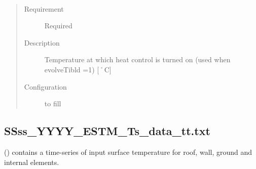 \documentclass[letterpaper,10pt,english]{sphinxmanual}
\begin{document}
\begin{fulllineitems}
\label{\detokenize{input_files/ESTM_related_files/ESTMinput:cmdoption-arg-theat-on}}~\begin{quote}\begin{description}
\item[{Requirement}] \leavevmode
Required

\item[{Description}] \leavevmode
Temperature at which heat control is turned on (used when evolveTibld =1) {[}˚C{]}

\item[{Configuration}] \leavevmode
to fill

\end{description}\end{quote}

\end{fulllineitems}



\subsection{SSss\_YYYY\_ESTM\_Ts\_data\_tt.txt}
\label{\detokenize{input_files/ESTM_related_files/ESTM_related_files:id2}}\label{\detokenize{input_files/ESTM_related_files/ESTM_related_files:ssss-yyyy-estm-ts-data-tt-txt}}
{\hyperref[\detokenize{input_files/ESTM_related_files/ESTM_related_files:ssss-yyyy-estm-ts-data-tt-txt}]{}} () contains a time-series of input surface
temperature for roof, wall, ground and internal elements.
\end{document}
